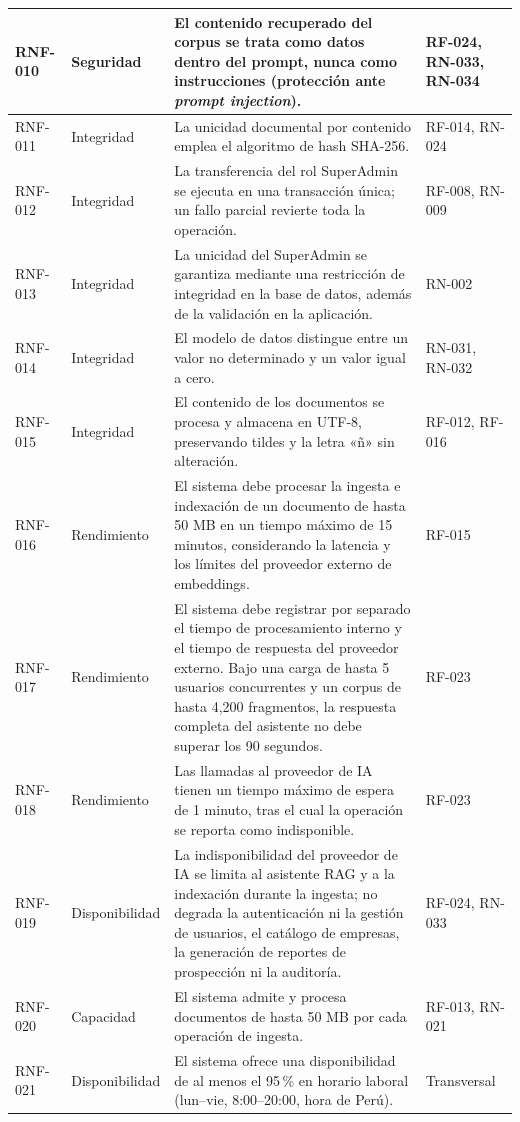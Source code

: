 \begin{longtable}{|C{1.7cm}|L{2.9cm}|L{6.4cm}|L{3.4cm}|}
\hline
RNF-010 & Seguridad & El contenido recuperado del corpus se trata como datos dentro del prompt, nunca como instrucciones (protección ante \emph{prompt injection}). & RF-024, RN-033, RN-034 \\
\hline
RNF-011 & Integridad & La unicidad documental por contenido emplea el algoritmo de hash SHA-256. & RF-014, RN-024 \\
\hline
RNF-012 & Integridad & La transferencia del rol SuperAdmin se ejecuta en una transacción única; un fallo parcial revierte toda la operación. & RF-008, RN-009 \\
\hline
RNF-013 & Integridad & La unicidad del SuperAdmin se garantiza mediante una restricción de integridad en la base de datos, además de la validación en la aplicación. & RN-002 \\
\hline
RNF-014 & Integridad & El modelo de datos distingue entre un valor no determinado y un valor igual a cero. & RN-031, RN-032 \\
\hline
RNF-015 & Integridad & El contenido de los documentos se procesa y almacena en UTF-8, preservando tildes y la letra «ñ» sin alteración. & RF-012, RF-016 \\
\hline
RNF-016 & Rendimiento & El sistema debe procesar la ingesta e indexación de un documento de hasta 50 MB en un tiempo máximo de 15 minutos, considerando la latencia y los límites del proveedor externo de embeddings. & RF-015 \\
\hline
RNF-017 & Rendimiento & El sistema debe registrar por separado el tiempo de procesamiento interno y el tiempo de respuesta del proveedor externo. Bajo una carga de hasta 5 usuarios concurrentes y un corpus de hasta 4,200 fragmentos, la respuesta completa del asistente no debe superar los 90 segundos. & RF-023 \\
\hline
RNF-018 & Rendimiento & Las llamadas al proveedor de IA tienen un tiempo máximo de espera de 1 minuto, tras el cual la operación se reporta como indisponible. & RF-023 \\
\hline
RNF-019 & Disponibilidad & La indisponibilidad del proveedor de IA se limita al asistente RAG y a la indexación durante la ingesta; no degrada la autenticación ni la gestión de usuarios, el catálogo de empresas, la generación de reportes de prospección ni la auditoría. & RF-024, RN-033 \\
\hline
RNF-020 & Capacidad & El sistema admite y procesa documentos de hasta 50 MB por cada operación de ingesta. & RF-013, RN-021 \\
\hline
RNF-021 & Disponibilidad & El sistema ofrece una disponibilidad de al menos el 95\,\% en horario laboral (lun–vie, 8:00–20:00, hora de Perú). & Transversal \\

\end{longtable}
